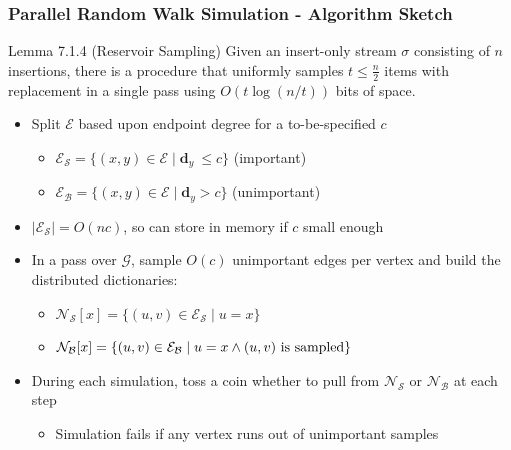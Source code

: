 \documentclass{beamer}
\begin{document}
\begin{frame}
\frametitle{Parallel Random Walk Simulation - Algorithm Sketch}

\begin{block}{Lemma 7.1.4 (Reservoir Sampling)}
Given an insert-only stream $\sigma$ consisting of $n$ insertions, there is a procedure that uniformly samples $t \leq \frac{n}{2}$ items with replacement in a single pass using $O(t\log(n/t))$ bits of space. 
\end{block}

\begin{itemize}
	\item Split $\mathcal{E}$ based upon endpoint degree for a to-be-specified $c$
	\begin{itemize}
		\item $\mathcal{E}_\mathcal{S} = \{(x, y) \in \mathcal{E} \mid \mathbf{d}_y \ \leq c \}$ (important)
		\item $\mathcal{E}_\mathcal{B} = \{(x, y) \in \mathcal{E} \mid \mathbf{d}_y > c \}$ (unimportant)
	\end{itemize}
	\item $|\mathcal{E}_\mathcal{S}| = O(nc)$, so can store in memory if $c$ small enough
	\item In a pass over $\mathcal{G}$, sample $O(c)$ unimportant edges per vertex and build the distributed dictionaries:
	\begin{itemize}
		\item $\mathcal{N}_\mathcal{S}[x] = \{(u, v) \in \mathcal{E}_\mathcal{S} \mid u = x \}$
		\item $\mathcal{N}_\mathcal{B}[x]= \{(u, v) \in \mathcal{E}_\mathcal{B} \mid u = x \wedge \textnormal{$(u, v)$ is sampled} \}$
	\end{itemize}
	\item During each simulation, toss a coin whether to pull from $\mathcal{N}_\mathcal{S}$ or $\mathcal{N}_\mathcal{B}$ at each step
	\begin{itemize}
		\item Simulation fails if any vertex runs out of unimportant samples
	\end{itemize}
\end{itemize}





\end{frame}
\end{document}
